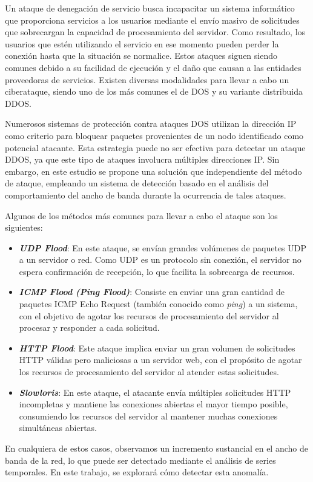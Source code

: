 
Un ataque de denegación de servicio busca incapacitar un sistema informático que proporciona servicios a los usuarios mediante el envío masivo de solicitudes que sobrecargan la capacidad de procesamiento del servidor. Como resultado, los usuarios que estén utilizando el servicio en ese momento pueden perder la conexión hasta que la situación se normalice. Estos ataques siguen siendo comunes debido a su facilidad de ejecución y el daño que causan a las entidades proveedoras de servicios. Existen diversas modalidades para llevar a cabo un ciberataque, siendo uno de los más comunes el de \ac{DOS} y su variante distribuida \ac{DDOS}.

Numerosos sistemas de protección contra ataques \ac{DOS} utilizan la dirección IP como criterio para bloquear paquetes provenientes de un nodo identificado como potencial atacante. Esta estrategia puede no ser efectiva para detectar un ataque \ac{DDOS}, ya que este tipo de ataques involucra múltiples direcciones IP. Sin embargo, en este estudio se propone una solución que independiente del método de ataque, empleando un sistema de detección basado en el análisis del comportamiento del ancho de banda durante la ocurrencia de tales ataques.

Algunos de los métodos más comunes para llevar a cabo el ataque son los siguientes:
\begin{itemize}
    \item \textbf{\textit{UDP Flood}}: En este ataque, se envían grandes volúmenes de paquetes \ac{UDP} a un servidor o red. Como \ac{UDP} es un protocolo sin conexión, el servidor no espera confirmación de recepción, lo que facilita la sobrecarga de recursos.
    
    \item \textbf{\textit{ICMP Flood (Ping Flood)}}: Consiste en enviar una gran cantidad de paquetes \ac{ICMP} Echo Request (también conocido como \textit{ping}) a un sistema, con el objetivo de agotar los recursos de procesamiento del servidor al procesar y responder a cada solicitud.
    
    \item \textbf{\textit{HTTP Flood}}: Este ataque implica enviar un gran volumen de solicitudes \ac{HTTP} válidas pero maliciosas a un servidor web, con el propósito de agotar los recursos de procesamiento del servidor al atender estas solicitudes.
    
    \item \textbf{\textit{Slowloris}}: En este ataque, el atacante envía múltiples solicitudes \ac{HTTP} incompletas y mantiene las conexiones abiertas el mayor tiempo posible, consumiendo los recursos del servidor al mantener muchas conexiones simultáneas abiertas.
\end{itemize}
En cualquiera de estos casos, observamos un incremento sustancial en el ancho de banda de la red, lo que puede ser detectado mediante el análisis de series temporales.
En este trabajo, se explorará cómo detectar esta anomalía.
